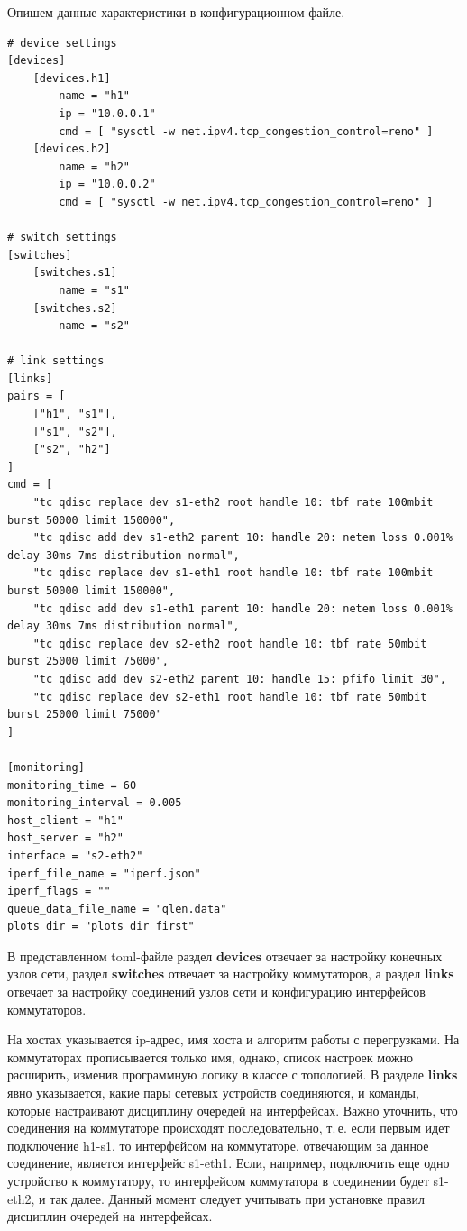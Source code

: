 Опишем данные характеристики в конфигурационном файле.
\begin{verbatim}
# device settings
[devices]
    [devices.h1]
        name = "h1"
        ip = "10.0.0.1"
        cmd = [ "sysctl -w net.ipv4.tcp_congestion_control=reno" ]
    [devices.h2]
        name = "h2"
        ip = "10.0.0.2"
        cmd = [ "sysctl -w net.ipv4.tcp_congestion_control=reno" ]

# switch settings
[switches]
    [switches.s1]
        name = "s1"
    [switches.s2]
        name = "s2"

# link settings
[links]
pairs = [
    ["h1", "s1"],
    ["s1", "s2"],
    ["s2", "h2"]
]
cmd = [
    "tc qdisc replace dev s1-eth2 root handle 10: tbf rate 100mbit burst 50000 limit 150000",
    "tc qdisc add dev s1-eth2 parent 10: handle 20: netem loss 0.001% delay 30ms 7ms distribution normal",
    "tc qdisc replace dev s1-eth1 root handle 10: tbf rate 100mbit burst 50000 limit 150000",
    "tc qdisc add dev s1-eth1 parent 10: handle 20: netem loss 0.001% delay 30ms 7ms distribution normal",
    "tc qdisc replace dev s2-eth2 root handle 10: tbf rate 50mbit burst 25000 limit 75000",
    "tc qdisc add dev s2-eth2 parent 10: handle 15: pfifo limit 30",
    "tc qdisc replace dev s2-eth1 root handle 10: tbf rate 50mbit burst 25000 limit 75000"
]

[monitoring]
monitoring_time = 60
monitoring_interval = 0.005
host_client = "h1"
host_server = "h2"
interface = "s2-eth2"
iperf_file_name = "iperf.json"
iperf_flags = ""
queue_data_file_name = "qlen.data"
plots_dir = "plots_dir_first"
\end{verbatim}

В представленном toml-файле раздел \textbf{devices} отвечает за
настройку конечных узлов сети, раздел \textbf{switches} отвечает за
настройку коммутаторов, а раздел \textbf{links} отвечает за настройку
соединений узлов сети и конфигурацию интерфейсов коммутаторов.

На хостах указывается ip-адрес, имя хоста и алгоритм работы с
перегрузками. На коммутаторах прописывается только имя, однако, список
настроек можно расширить, изменив программную логику в классе с
топологией. В разделе \textbf{links} явно указывается, какие пары
сетевых устройств соединяются, и команды, которые настраивают дисциплину
очередей на интерфейсах. Важно уточнить, что соединения на коммутаторе
происходят последовательно, т.\,е. если первым идет подключение h1-s1, то
интерфейсом на коммутаторе, отвечающим за данное соединение, является
интерфейс s1-eth1. Если, например, подключить еще одно устройство к
коммутатору, то интерфейсом коммутатора в соединении будет s1-eth2, и
так далее. Данный момент следует учитывать при установке правил
дисциплин очередей на интерфейсах.

